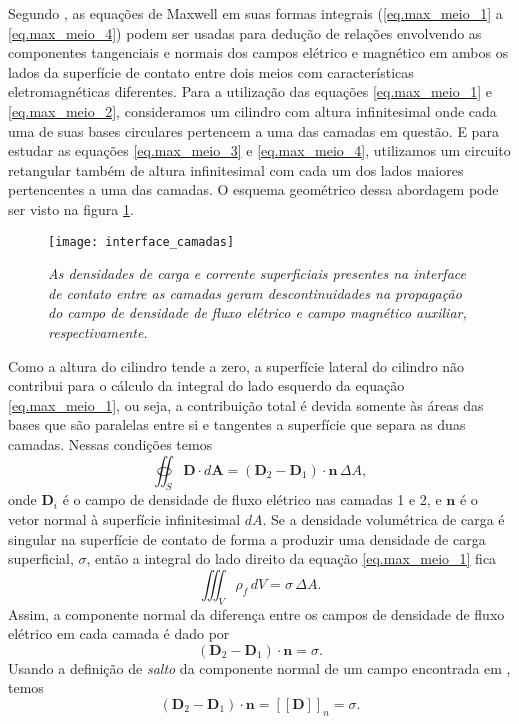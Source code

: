 Segundo \cite{jackson_classical_1999}, as equa\c{c}\~oes de Maxwell em suas formas integrais (\ref{eq.max_meio_1} a \ref{eq.max_meio_4}) podem ser usadas para dedu\c{c}\~ao de rela\c{c}\~oes envolvendo as componentes tangenciais e normais dos campos el\'etrico e magn\'etico em ambos os lados da superf\'icie de contato entre dois meios com caracter\'isticas eletromagn\'eticas diferentes. Para a utiliza\c{c}\~ao das equa\c{c}\~oes \ref{eq.max_meio_1} e \ref{eq.max_meio_2}, consideramos um cilindro com altura infinitesimal onde cada uma de suas bases circulares pertencem a uma das camadas em quest\~ao. E para estudar as equa\c{c}\~oes \ref{eq.max_meio_3} e \ref{eq.max_meio_4}, utilizamos um circuito retangular tamb\'em de altura infinitesimal com cada um dos lados maiores pertencentes a uma das camadas. O esquema geom\'etrico dessa abordagem pode ser visto na figura \ref{fig.cond_contorno}. 
\begin{figure}[!htb]
\centering
\texttt{[image: interface\_camadas]}
\caption{\textit{As densidades de carga e corrente superficiais presentes na interface de contato entre as camadas geram descontinuidades na propaga\c{c}\~ao do campo de densidade de fluxo el\'etrico e campo magn\'etico auxiliar, respectivamente.}}
\label{fig.cond_contorno}
\end{figure}
Como a altura do cilindro tende a zero, a superf\'icie lateral do cilindro n\~ao contribui para o c\'alculo da integral do lado esquerdo da equa\c{c}\~ao \ref{eq.max_meio_1}, ou seja, a contribui\c{c}\~ao total \'e devida somente \`as \'areas das bases que s\~ao paralelas entre si e tangentes a superf\'icie que separa as duas camadas. Nessas condi\c{c}\~oes temos
\begin{equation*}
\oiint_S\mathbf{D}\cdot d\mathbf{A} = (\mathbf{D}_2-\mathbf{D}_1)\cdot\mathbf{n}\,\Delta A,
\end{equation*}
onde $\mathbf{D}_i$ \'e o campo de densidade de fluxo el\'etrico nas camadas 1 e 2, e $\mathbf{n}$ \'e o vetor normal \`a superf\'icie infinitesimal $dA$. Se a densidade volum\'etrica de carga \'e singular na superf\'icie de contato de forma a produzir uma densidade de carga superficial, $\sigma$, ent\~ao a integral do lado direito da equa\c{c}\~ao \ref{eq.max_meio_1} fica
\begin{equation*}
\iiint_V\rho_f\,dV=\sigma\,\Delta A.
\end{equation*}
Assim, a componente normal da diferen\c{c}a entre os campos de densidade de fluxo el\'etrico em cada camada \'e dado por
\begin{equation*}
(\mathbf{D}_2-\mathbf{D}_1)\cdot\mathbf{n}=\sigma. 
\end{equation*} 
Usando a defini\c{c}\~ao de \textit{salto} da componente normal de um campo encontrada em \cite{erigen_1963}, temos
\begin{equation}\label{eq.gau_meio_1}
(\mathbf{D}_2-\mathbf{D}_1)\cdot\mathbf{n}=\left[\left[\mathbf{D}\right]\right]_n=\sigma.
\end{equation}

